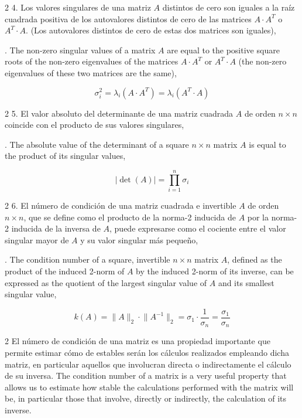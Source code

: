 \begin{paracol}{2}
4. Los valores singulares de una matriz $A$ distintos de cero son iguales a la raíz cuadrada positiva de los autovalores distintos de cero de las matrices $A\cdot A^T$ o $A^T\cdot A$. (Los autovalores distintos de cero de estas dos matrices son iguales),

. The non-zero singular values of a matrix $A$ are equal to the positive square roots of the non-zero eigenvalues of the matrices $A\cdot A^T$ or $A^T\cdot A$ (the non-zero eigenvalues of these two matrices are the same),
\end{paracol}
\begin{equation*}
\sigma_i^2=\lambda_i(A\cdot A^T)=\lambda_i(A^T\cdot A)
\end{equation*}
\begin{paracol}{2}
5. El valor absoluto del determinante de una matriz cuadrada $A$ de orden $n\times n$ coincide con el producto de sus valores singulares,

. The absolute value of the determinant of a square $n\times n$ matrix $A$ is equal to the product of its singular values, 
\end{paracol}
\begin{equation*}
\vert \det(A) \vert = \prod_{i=1}^n \sigma_i
\end{equation*}
\begin{paracol}{2}
6. El número de condición de una matriz cuadrada e invertible $A$ de orden $n\times n$, que se define como el producto de la norma-2 inducida de $A$ por la norma-2 inducida de la inversa de $A$, puede expresarse como el cociente entre el valor singular mayor de $A$ y su valor singular más pequeño,

. The condition number of a square, invertible $n\times n$ matrix $A$, defined as the product of the induced 2-norm of $A$ by the induced 2-norm of its inverse, can be expressed as the quotient of the largest singular value of $A$ and its smallest singular value,
\end{paracol}
\begin{equation*}
k(A)=\lVert A \rVert_2 \cdot \lVert A^{-1} \rVert_2 = \sigma_1 \cdot \frac{1}{\sigma_n}=\frac{\sigma_1}{\sigma_n}
\end{equation*}
\begin{paracol}{2}
El número de condición de una matriz es una propiedad importante que permite estimar cómo de estables serán los cálculos realizados empleando dicha matriz, en particular aquellos que involucran directa o indirectamente el cálculo de su inversa.
\switchcolumn
The condition number of a matrix is a very useful property that allows us to estimate how stable the calculations performed with the matrix will be, in particular those that involve, directly or indirectly, the calculation of its inverse.
\end{paracol}

